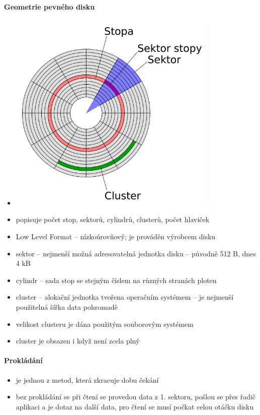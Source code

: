 \documentclass[a4paper,12pt]{article}
\providecommand{\tightlist}{%
\setlength{\itemsep}{0pt}\setlength{\parskip}{0pt}}
\begin{document}
\paragraph{Geometrie pevného disku}

\begin{itemize}
\tightlist
\item[] \includegraphics[width=10.089cm]{ref/geometrie-disku.png}
\item popisuje počet stop, sektorů, cylindrů, clusterů, počet hlaviček
\item Low Level Format -- nízkoúrovňový; je prováděn výrobcem disku
\item sektor -- nejmenší možná adresovatelná jednotka disku -- původně 512
  B, dnes 4 kB
\item cylindr -- sada stop se stejným číslem na různých stranách ploten
\item cluster -- alokační jednotka tvořena operačním systémem -- je nejmenší
  použitelná šířka data pohromadě
\item velikost clusteru je dána použitým souborovým systémem
\item cluster je obsazen i když není zcela plný
\end{itemize}

\paragraph{Prokládání}

\begin{itemize}
\tightlist
\item je jednou z metod, která zkracuje dobu čekání
\item bez prokládání se při čtení se provedou data z 1. sektoru, pošlou se
  přes řadič aplikaci a je dotaz na další data, pro čtení se musí počkat
  celou otáčku disku
\end{itemize}
\end{document}
